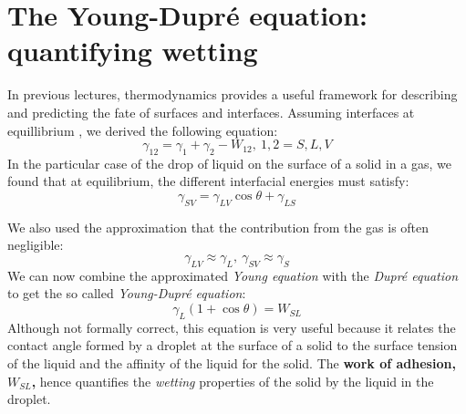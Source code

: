 \documentclass[a4paper, 11pt, normalem]{report}
\begin{document}
\section{The Young-Dupr\'{e} equation: quantifying wetting}
In previous lectures, thermodynamics provides a useful framework for describing and predicting the fate of surfaces and interfaces.
Assuming interfaces at equillibrium , we derived the following equation:
\begin{equation}
    \gamma_{12} = \gamma_1 + \gamma_2 - W_{12},~ 1,2 = S,L,V
\end{equation}
In the particular case of the drop of liquid on the surface of a solid in a gas, we found that at equilibrium, the different interfacial energies must satisfy:
\begin{equation}
    \gamma_{SV} = \gamma_{LV}\cos\theta + \gamma_{LS}
\end{equation}
\begin{figure}[H]
    \centering
\end{figure}
We also used the approximation that the contribution from the gas is often negligible:
\begin{equation}
    \gamma_{LV} \approx \gamma_L,~ \gamma_{SV} \approx \gamma_S
\end{equation}
We can now combine the approximated \textit{Young equation} with the \textit{Dupr\'{e} equation} to get the so called \textit{Young-Dupr\'{e} equation}:
\begin{equation}
    \gamma_L (1+\cos\theta) = W_{SL}
\end{equation}
Although not formally correct, this equation is very useful because it relates the contact angle formed by a droplet at the surface of a solid to the surface tension of the liquid and the affinity of the liquid for the solid.
The \textbf{work of adhesion, $W_{SL}$,} hence quantifies the \textit{wetting} properties of the solid by the liquid in the droplet.
\end{document}

